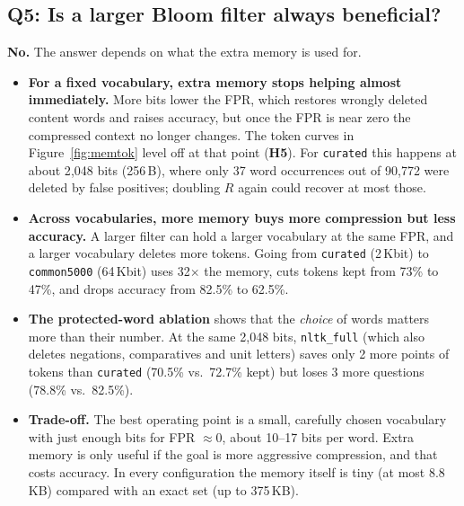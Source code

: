 \documentclass[11pt]{article}
\newcommand{\code}[1]{\texttt{#1}}
\begin{document}
\subsection{Q5: Is a larger Bloom filter always beneficial?}
\textbf{No.} The answer depends on what the extra memory is used for.
\begin{itemize}
  \item \textbf{For a fixed vocabulary, extra memory stops helping almost immediately.} More bits
        lower the FPR, which restores wrongly deleted content words and raises accuracy, but once the
        FPR is near zero the compressed context no longer changes. The token curves in
        Figure~\ref{fig:memtok} level off at that point (\textbf{H5}). For \code{curated} this happens
        at about 2{,}048 bits (256\,B), where only 37 word occurrences out of 90{,}772 were deleted by
        false positives; doubling $R$ again could recover at most those.
  \item \textbf{Across vocabularies, more memory buys more compression but less accuracy.} A larger
        filter can hold a larger vocabulary at the same FPR, and a larger vocabulary deletes more
        tokens. Going from \code{curated} (2\,Kbit) to \code{common5000} (64\,Kbit) uses 32$\times$ the
        memory, cuts tokens kept from 73\% to 47\%, and drops accuracy from 82.5\% to 62.5\%.
  \item \textbf{The protected-word ablation} shows that the \emph{choice} of words matters more
        than their number. At the same 2{,}048 bits, \code{nltk\_full} (which also deletes negations,
        comparatives and unit letters) saves only 2 more points of tokens than \code{curated} (70.5\%
        vs.\ 72.7\% kept) but loses 3 more questions (78.8\% vs.\ 82.5\%).
  \item \textbf{Trade-off.} The best operating point is a small, carefully chosen vocabulary with
        just enough bits for FPR $\approx 0$, about 10--17 bits per word. Extra memory is only useful
        if the goal is more aggressive compression, and that costs accuracy. In every configuration
        the memory itself is tiny (at most 8.8\,KB) compared with an exact set (up to 375\,KB).
\end{itemize}

\end{document}
